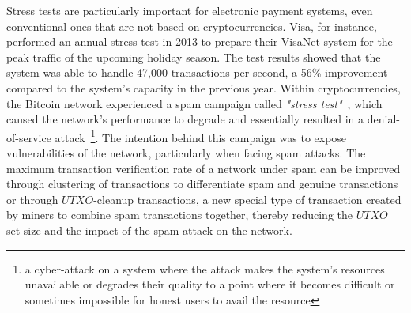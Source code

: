Stress tests are particularly important for electronic payment systems, even conventional ones that are not based on cryptocurrencies. Visa, for instance, performed an annual stress test in 2013 to prepare their VisaNet system for the peak traffic of the upcoming holiday season. The test results showed that the system was able to handle 47,000 transactions per second, a 56\% improvement compared to the system's capacity in the previous year. %
Within cryptocurrencies, the Bitcoin network experienced a spam campaign called \textit{"stress test"}~\cite{baqer2016stressing}, which caused the network's performance to degrade and essentially resulted in a denial-of-service attack~\footnote{a cyber-attack on a system where the attack makes the system's resources unavailable or degrades their quality to a point where it becomes difficult or sometimes impossible for honest users to avail the resource}. The intention behind this campaign was to expose vulnerabilities of the network, particularly when facing spam attacks. The maximum transaction verification rate of a network under spam can be improved through clustering of transactions to differentiate spam and genuine transactions~\cite{baqer2016stressing} or through $UTXO$-cleanup transactions, a new special type of transaction created by miners to combine spam transactions together, thereby reducing the $UTXO$ set size and the impact of the spam attack on the network.

